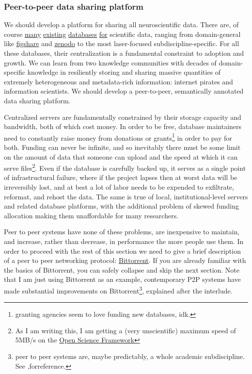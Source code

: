\documentclass{article}
\begin{document}
\hypertarget{peer-to-peer-data-sharing-platform}{%
\subsubsection{Peer-to-peer data sharing
platform}\label{peer-to-peer-data-sharing-platform}}

We should develop a platform for sharing all neuroscientific data. There
are, of course \href{https://www.dandiarchive.org/}{many}
\href{https://openneuro.org/}{existing}
\href{https://www.brainminds.riken.jp/}{databases}
\href{https://biccn.org/}{for} scientific data, ranging from
domain-general like \href{https://figshare.com/}{figshare} and
\href{https://zenodo.org/}{zenodo} to the most laser-focused
subdiscipline-specific. For all these databases, their centralization is
a fundamental constraint to adoption and growth. We can learn from two
knowledge communities with decades of domain-specific knowledge in
resiliently storing and sharing massive quantities of extremely
heterogeneous and metadata-rich information: internet pirates and
information scientists. We should develop a peer-to-peer, semantically
annotated data sharing platform.

Centralized servers are fundamentally constrained by their storage
capacity and bandwidth, both of which cost money. In order to be free,
database maintainers need to constantly raise money from donations or
grants\footnote{granting agencies seem to love funding new databases,
  idk.} in order to pay for both. Funding can never be infinite, and so
inevitably there must be some limit on the amount of data that someone
can upload and the speed at which it can serve files\footnote{As I am
  writing this, I am getting a (very unscientific) maximum speed of
  5MB/s on the \href{https://osf.io}{Open Science Framework}}. Even if
the database is carefully backed up, it serves as a single point of
infrastructural failure, where if the project lapses then at worst data
will be irreversibly lost, and at best a lot of labor needs to be
expended to exfiltrate, reformat, and rehost the data. The same is true
of local, institutional-level servers and related database platforms,
with the additional problem of skewed funding allocation making them
unaffordable for many researchers.

Peer to peer systems have none of these problems, are inexpensive to
maintain, and increase, rather than decrease, in performance the more
people use them. In order to proceed with the rest of this section we
need to give a brief description of a peer to peer networking protocol:
\href{https://en.wikipedia.org/wiki/BitTorrent}{Bittorrent}. If you are
already familiar with the basics of Bittorrent, you can safely collapse
and skip the next section. Note that I am just using Bittorrent as an
example, contemporary P2P systems have made substantial improvements on
Bittorrent\footnote{peer to peer systems are, maybe predictably, a whole
  academic subdiscipline. See \cite{shenHandbookPeertoPeerNetworking2010},forreference.}, explained
after the interlude.
\end{document}
